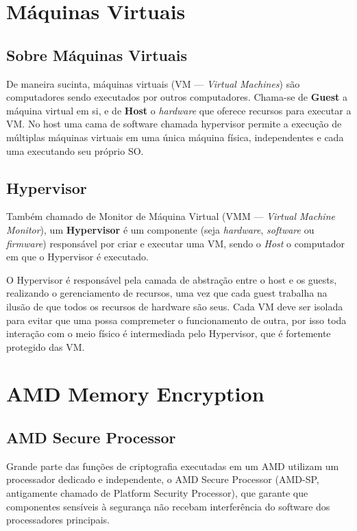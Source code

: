 \documentclass{report}
\title{\todo{A gente descobre depois}}
\author{João Gabriel Trombeta\\
        João Paulo Taylor Ienczak Zanette\\
        Ranieri Schroeder Althoff}
\date{\today}
\begin{document}
\maketitle

\tableofcontents

\chapter{Máquinas Virtuais}

\section{Sobre Máquinas Virtuais}

De maneira sucinta, máquinas virtuais (VM --- \textit{Virtual Machines}) são
computadores sendo executados por outros computadores. Chama-se de
\textbf{Guest} a máquina virtual em si, e de \textbf{Host} o \textit{hardware}
que oferece recursos para executar a VM\@. No host uma cama de software chamada
hypervisor permite a execução de múltiplas máquinas virtuais em uma única
máquina física, independentes e cada uma executando seu próprio SO.

\section{Hypervisor}

Também chamado de Monitor de Máquina Virtual (VMM --- \textit{Virtual Machine
Monitor}), um \textbf{Hypervisor} é um componente (seja \textit{hardware},
\textit{software} ou \textit{firmware}) responsável por criar e executar uma
VM, sendo o \textit{Host} o computador em que o Hypervisor é executado.

O Hypervisor é responsável pela camada de abstração entre o host e os guests,
realizando o gerenciamento de recursos, uma vez que cada guest trabalha na
ilusão de que todos os recursos de hardware são seus. Cada VM deve ser isolada
para evitar que uma possa compremeter o funcionamento de outra, por isso toda
interação com o meio físico é intermediada pelo Hypervisor, que é fortemente
protegido das VM\@.

\chapter{AMD Memory Encryption}

\section{AMD Secure Processor}
Grande parte das funções de criptografia executadas em um AMD utilizam um
processador dedicado e independente, o AMD Secure Processor (AMD-SP,
antigamente chamado de Platform Security Processor), que garante que
componentes sensíveis à segurança não recebam interferência do software dos
processadores principais.
\end{document}
